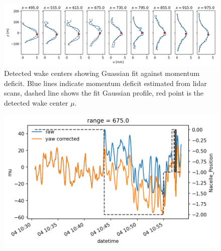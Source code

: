 \documentclass[%
 aip,
 amsmath,
 amssymb,
preprint,%
]{revtex4-2}
\begin{document}
\begin{figure}[h]
  \centering
  \includegraphics[width=\textwidth]{figs/wakeCenter_byRange_20240925.png}
  \caption{Detected wake centers showing Guassian fit against momentum deficit. Blue lines indicate momentum deficit estimated from lidar scans, dashed line shows the fit Gaussian profile, red point is the detected wake center $\mu$.}
  \label{fig:wakeCenterByRange}
\end{figure}

\begin{figure}[h]
  \centering
  \includegraphics[width=\textwidth]{figs/yawCorrectedWakeCenter_20240925.png}
  \caption{}
  \label{fig:yawCorrectedWakeCenter}
\end{figure}
\end{document}
